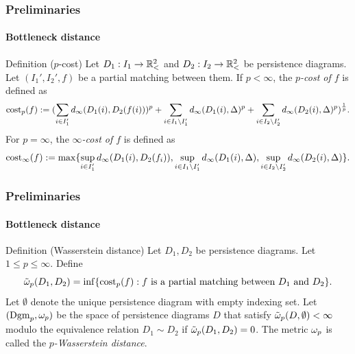 \documentclass[aspectratio=169]{beamer}
\begin{document}
\begin{frame}
  \frametitle{Preliminaries}
  \framesubtitle{Bottleneck distance}
  \begin{block}{Definition ($p$-cost)}
    Let $ D_1: I_1 \to \mathbb{R}_<^2 $ and $ D_2: I_2 \to \mathbb{R}_<^2 $ be persistence diagrams. Let $ (I_1', I_2', f) $ be a partial matching between them. If $ p < \infty $, the {\it $p$-cost of $ f $} is defined as
    \begin{equation}
        \operatorname{cost}_p(f) := (\sum_{i \in I_1'} d_\infty(D_1(i), D_2(f(i)))^p
        + \sum_{i \in I_1 \setminus I_1'} d_\infty(D_1(i), \Delta)^p
        + \sum_{i \in I_2 \setminus I_2'} d_\infty(D_2(i), \Delta)^p )^{\frac{1}{p}}.
    \end{equation}
    For $ p = \infty $, the {\it $\infty$-cost of $ f $} is defined as
    \begin{equation}
        \operatorname{cost}_\infty(f) := \max \{\sup_{i \in I_1'} d_\infty(D_1(i), D_2(f_i)),
        \sup_{i\in I_1 \setminus I_1'} d_\infty(D_1(i), \Delta),
        \sup_{i\in I_2 \setminus I_2'} d_\infty(D_2(i), \Delta)\}.
    \end{equation}
  \end{block}
\end{frame}

\begin{frame}
  \frametitle{Preliminaries}
  \framesubtitle{Bottleneck distance}
  \begin{block}{Definition (Wasserstein distance)}
    Let $ D_1, D_2 $ be persistence diagrams. Let $ 1 \leq p \leq \infty $. Define
    \begin{equation}
        \tilde \omega_p (D_1, D_2) = \inf \{\operatorname{cost}_p(f) : f \text{ is a partial matching between } D_1 \text{ and } D_2 \}.
    \end{equation}
    Let $ \emptyset $ denote the unique persistence diagram with empty indexing set. Let $ (\operatorname{Dgm}_p, \omega_p) $ be the space of persistence diagrams $ D $ that satisfy $ \tilde \omega_p(D, \emptyset) < \infty $ modulo the equivalence relation $ D_1 \sim D_2 $ if $ \tilde \omega_p (D_1, D_2) = 0 $. The metric $ \omega_p $ is called the {\it $p$-Wasserstein distance}.
  \end{block}
\end{frame}
\end{document}
